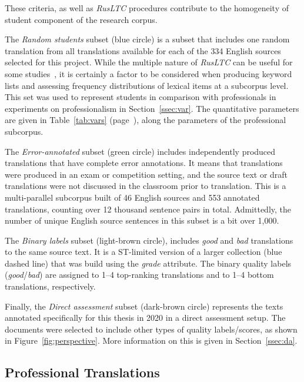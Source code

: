 These criteria, as well as \textit{RusLTC} procedures contribute to the homogeneity of student component of the research corpus. 

The \textit{Random students} subset (blue circle) is a subset that includes one random translation from all translations available for each of the 334 English sources selected for this project. While the multiple nature of \textit{RusLTC} can be useful for some studies~\cite[see][]{Castagnoli2009}, it is certainly a factor to be considered when producing keyword lists and assessing frequency distributions of lexical items at a subcorpus level. This set was used to represent students in comparison with professionals in experiments on professionalism in Section~\ref{ssec:var}. The quantitative parameters are given in Table~\ref{tab:vars} (page~\pageref{tab:vars}), along the parameters of the professional subcorpus.

The \textit{Error-annotated} subset (green circle) includes independently produced translations that have complete error annotations. It means that translations were produced in an exam or competition setting, and the source text or draft translations were not discussed in the classroom prior to translation. This is a multi-parallel subcorpus built of 46 English sources and 553 annotated translations, counting over 12 thousand sentence pairs in total. Admittedly, the number of unique English source sentences in this subset is a bit over 1,000.

The \textit{Binary labels} subset (light-brown circle), includes \textit{good} and \textit{bad} translations to the same source text. It is a ST-limited version of a larger collection (blue dashed line) that was build using the \textit{grade} attribute. The binary quality labels (\textit{good}/\textit{bad}) are assigned to 1--4 top-ranking translations and to 1--4 bottom translations, respectively.

Finally, the \textit{Direct assessment} subset (dark-brown circle) represents the texts annotated specifically for this thesis in 2020 in a direct assessment setup.  The documents were selected to include other types of quality labels/scores, as shown in Figure~\ref{fig:perspective}. More information on this is given in Section~\ref{ssec:da}.

\subsection{\label{ssec:mypro}Professional Translations}

